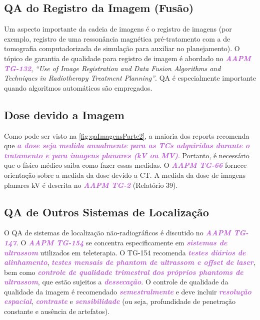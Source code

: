 \documentclass[11pt,a4paper]{article}
\newcounter{exemplo}
\begin{document}
\subsection*{QA do Registro da Imagem (Fusão)}

    Um aspecto importante da cadeia de imagens é o registro de imagens (por exemplo, registro de uma ressonância magnética pré-tratamento com a de tomografia computadorizada de simulação para auxiliar no planejamento). O tópico de garantia de qualidade para registro de imagem é abordado no \textcolor{MediumOrchid}{\textbf{\textit{AAPM TG-132}}}, \textit{``Use of Image Registration and Data Fusion Algorithms and Techniques in Radiotherapy Treatment Planning''}. QA é especialmente importante quando algoritmos automáticos são empregados.

\subsection*{Dose devido a Imagem}

    Como pode ser visto na \ref{fig:qaImagensParte2}, a maioria dos reports recomenda que \textcolor{MediumOrchid}{\textbf{\textit{a dose seja medida anualmente para as TCs adquiridas durante o tratamento e para imagens planares (kV ou MV)}}}. Portanto, é necessário que o físico médico saiba como fazer essas medidas. O \textcolor{MediumOrchid}{\textbf{\textit{AAPM TG-66}}} fornece orientação sobre a medida da dose devido a CT. A medida da dose de imagens planares kV é descrita no \textcolor{MediumOrchid}{\textbf{\textit{AAPM TG-2}}} (Relatório 39).

\subsection*{QA de Outros Sistemas de Localização}

    O QA de sistemas de localização não-radiográficos é discutido no \textcolor{MediumOrchid}{\textbf{\textit{AAPM TG-147}}}. O \textcolor{MediumOrchid}{\textbf{\textit{AAPM TG-154}}} se concentra especificamente em \textcolor{MediumOrchid}{\textbf{\textit{sistemas de ultrassom }}}utilizados em teleterapia. O TG-154 recomenda \textcolor{MediumOrchid}{\textbf{\textit{testes diários de alinhamento}}}, \textcolor{MediumOrchid}{\textbf{\textit{testes mensais de phantom de ultrassom e offset de laser}}}, bem como \textcolor{MediumOrchid}{\textbf{\textit{controle de qualidade trimestral dos próprios phantoms de ultrassom}}}, que estão sujeitos a \textcolor{MediumOrchid}{\textbf{\textit{dessecação}}}. O controle de qualidade da qualidade da imagem é recomendado \textcolor{MediumOrchid}{\textbf{\textit{semestralmente}}} e deve incluir \textcolor{MediumOrchid}{\textbf{\textit{resolução espacial}}}, \textcolor{MediumOrchid}{\textbf{\textit{contraste}}} e \textcolor{MediumOrchid}{\textbf{\textit{sensibilidade}}} (ou seja, profundidade de penetração constante e ausência de artefatos). 
    
\end{document}
